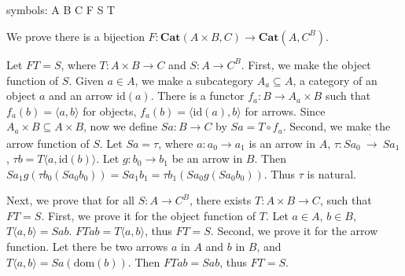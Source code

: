 \documentclass[luatex]{article}
\begin{document}
\subsubsection{}

\subsubsection{}

\subsubsection{}

\subsection{}

\subsubsection{}

\showArt

symbols: A B C F S T

We prove there is a bijection $F : \mathbf{Cat}(A \times B, C) \rightarrow \mathbf{Cat}(A, C^B)$.

Let $FT = S$, where $T : A \times B \rightarrow C$ and $S : A \rightarrow C^B$. First, we make the object function of $S$. Given $a \in A$, we make a subcategory $A_a \subseteq A$, a category of an object $a$ and an arrow $\mathrm{id}(a)$. There is a functor $f_a : B \rightarrow A_a \times B$ such that $f_a(b) = \langle a, b \rangle$ for objects, $f_a(b) = \langle \mathrm{id}(a), b \rangle$ for arrows. Since $A_a \times B \subseteq A \times B$, now we define $Sa : B \rightarrow C$ by $Sa = T \circ f_a$. Second, we make the arrow function of $S$. Let $Sa = \tau$, where $a : a_0 \rightarrow a_1$ is an arrow in $A$, $\tau : S a_0\ \dot{\rightarrow}\ S a_1$, $\tau b = T\langle a, \mathrm{id}(b) \rangle$. Let $g : b_0 \rightarrow b_1$ be an arrow in $B$. Then $Sa_1g(\tau b_0(Sa_0b_0)) = Sa_1b_1 = \tau b_1(Sa_0g (Sa_0b_0))$. Thus $\tau$ is natural.

Next, we prove that for all $S : A \rightarrow C^B$, there exists $T : A \times B \rightarrow C$, such that $FT = S$. First, we prove it for the object function of $T$. Let $a \in A$, $b \in B$, $T\langle a, b \rangle = Sab$. $FTab = T\langle a, b \rangle$, thus $FT = S$. Second, we prove it for the arrow function. Let there be two arrows $a$ in $A$ and $b$ in $B$, and $T\langle a, b \rangle = Sa(\mathrm{dom}(b))$. Then $FTab = Sab$, thus $FT = S$.
\end{document}
